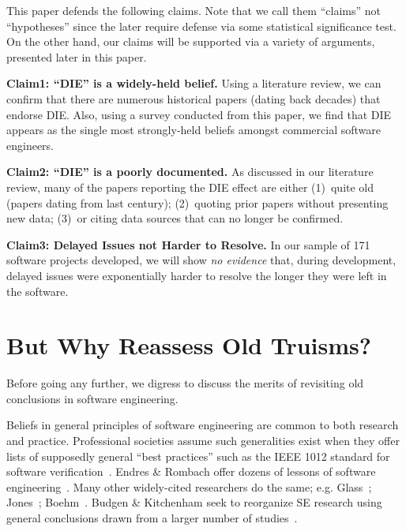 \documentclass[smallcondesed]{svjour3}
\begin{document}
This paper defends the  following claims. Note that we call them
``claims'' not ``hypotheses'' since the later require defense via some statistical
significance test. On the other hand, our claims will be supported via a variety
of arguments, presented later in this paper.

{\bf  Claim1: ``DIE'' is a  widely-held belief.}
Using a literature review, we can confirm that there are numerous historical papers (dating back decades)
that endorse DIE. Also, using a survey conducted from this paper, we find  that 
  DIE  appears as the
single most strongly-held beliefs amongst commercial software engineers.

{\bf  Claim2: ``DIE'' is a poorly documented.}
 As discussed in our literature review,  many of the papers reporting the DIE
effect are either (1)~quite old (papers dating from last century);
(2)~quoting prior papers without presenting   new data; 
(3)~or citing data sources that can no longer be
confirmed. 

{\bf Claim3: Delayed Issues not Harder to Resolve.}
 In our sample of 
 171 software  projects developed, we will show
{\em no evidence}  that, during development, delayed issues were exponentially harder to resolve the longer they were left
 in the software. 
 


 
 


\section{ But Why Reassess Old Truisms?}

Before going any further,  we digress to discuss the merits of revisiting
old conclusions in software engineering.


Beliefs in general
principles of software
engineering are common to both research and practice. Professional societies assume such generalities exist when they offer
 lists of supposedly general ``best practices'' such as
the IEEE 1012 standard for software verification~\cite{1012}. 
 Endres \& Rombach offer dozens of lessons of software engineering~\cite{endres03}.
 Many other 
widely-cited researchers  do the same; e.g.
Glass~\cite{glass02}; Jones~\cite{jones07}; Boehm~\cite{boehm00b}.
Budgen \& Kitchenham seek to reorganize SE research using
general
conclusions drawn from a larger number of studies~\cite{kitch04,budgen09}.
\end{document}

